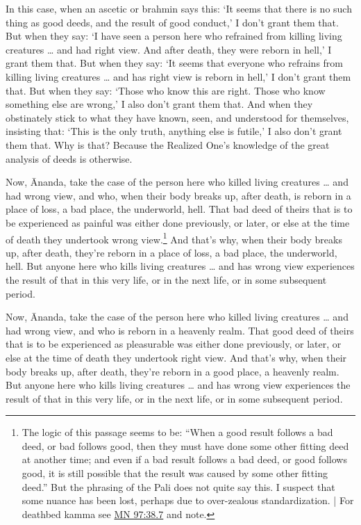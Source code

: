 \documentclass[12pt,openany]{book}%
\begin{document}
In this case, when an ascetic or brahmin says this: ‘It seems that there is no such thing as good deeds, and the result of good conduct,’ I don’t grant them that. But when they say: ‘I have seen a person here who refrained from killing living creatures … and had right view. And after death, they were reborn in hell,’ I grant them that. But when they say: ‘It seems that everyone who refrains from killing living creatures … and has right view is reborn in hell,’ I don’t grant them that. But when they say: ‘Those who know this are right. Those who know something else are wrong,’ I also don’t grant them that. And when they obstinately stick to what they have known, seen, and understood for themselves, insisting that: ‘This is the only truth, anything else is futile,’ I also don’t grant them that. Why is that? Because the Realized One’s knowledge of the great analysis of deeds is otherwise. 

Now, Ānanda, take the case of the person here who killed living creatures … and had wrong view, and who, when their body breaks up, after death, is reborn in a place of loss, a bad place, the underworld, hell. That bad deed of theirs that is to be experienced as painful was either done previously, or later, or else at the time of death they undertook wrong view.\footnote{The logic of this passage seems to be: “When a good result follows a bad deed, or bad follows good, then they must have done some other fitting deed at another time; and even if a bad result follows a bad deed, or good follows good, it is still possible that the result was caused by some other fitting deed.” But the phrasing of the Pali does not quite say this. I suspect that some nuance has been lost, perhaps due to over-zealous standardization. | For deathbed kamma see \href{https://suttacentral.net/mn97/en/sujato\#38.7}{MN 97:38.7} and note. } And that’s why, when their body breaks up, after death, they’re reborn in a place of loss, a bad place, the underworld, hell. But anyone here who kills living creatures … and has wrong view experiences the result of that in this very life, or in the next life, or in some subsequent period. 

Now, Ānanda, take the case of the person here who killed living creatures … and had wrong view, and who is reborn in a heavenly realm. That good deed of theirs that is to be experienced as pleasurable was either done previously, or later, or else at the time of death they undertook right view. And that’s why, when their body breaks up, after death, they’re reborn in a good place, a heavenly realm. But anyone here who kills living creatures … and has wrong view experiences the result of that in this very life, or in the next life, or in some subsequent period. 
\end{document}
